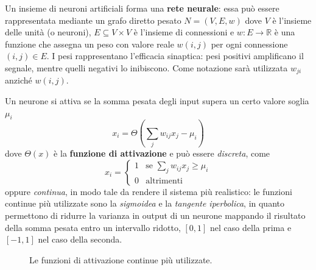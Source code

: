 \noindent Un insieme di neuroni artificiali forma una \textbf{rete neurale}: essa può essere rappresentata mediante un grafo diretto pesato $N=(V, E, w)$ dove $V$ è l'insieme delle unità (o neuroni), $E \subseteq V \times V$ è l'insieme di connessioni e $w:E \rightarrow \mathbb{R}$ è una funzione che assegna un peso con valore reale $w(i,j)$ per ogni connessione $(i, j)\in E$. I pesi rappresentano l'efficacia sinaptica: pesi positivi amplificano il segnale, mentre quelli negativi lo inibiscono. Come notazione sarà utilizzata $w_{ji}$ anziché $w(i,j)$.

Un neurone si attiva se la somma pesata degli input supera un certo valore soglia $\mu_i$
\begin{displaymath}
	x_i = \Theta\left(\sum_j w_{ij} x_j - \mu_i \right)
\end{displaymath}
dove $\Theta(x)$ è la \textbf{funzione di attivazione} e può essere \emph{discreta}, come
\begin{displaymath}
	x_i = \begin{cases}
		1 & \mbox{se } \displaystyle\sum_j w_{ij} x_j \geq \mu_i \\
		0 & \mbox{altrimenti} 
	\end{cases}
\end{displaymath}
oppure \emph{continua}, in modo tale da rendere il sistema più realistico: le funzioni continue più utilizzate sono la \emph{sigmoidea} e la \emph{tangente iperbolica}, in quanto permettono di ridurre la varianza in output di un neurone mappando il risultato della somma pesata entro un intervallo ridotto, $[0, 1]$ nel caso della prima e $[-1, 1]$ nel caso della seconda.
\begin{figure}[h!]
	\begin{center}
		\qquad
		\caption{Le funzioni di attivazione continue più utilizzate.}
	\end{center}
\end{figure}

